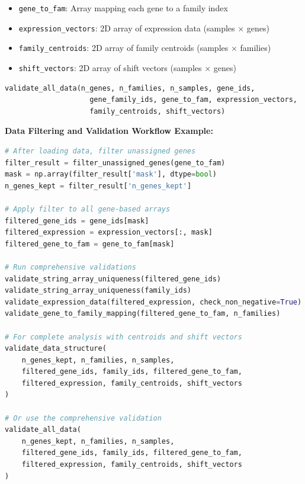 \begin{enumerate}
\begin{itemize}
\begin{itemize}
                    \item \texttt{gene\_to\_fam}: Array mapping each gene to a family index
                          
                    \item \texttt{expression\_vectors}: 2D array of expression data (samples
                          × genes)
                          
                    \item \texttt{family\_centroids}: 2D array of family centroids (samples
                          × families)
                          
                    \item \texttt{shift\_vectors}: 2D array of shift vectors (samples ×
                          genes)
                  \end{itemize}
                  
                  \begin{lstlisting}[language=Python, caption={Python Validate All Data}]
validate_all_data(n_genes, n_families, n_samples, gene_ids, 
                    gene_family_ids, gene_to_fam, expression_vectors, 
                    family_centroids, shift_vectors)
                  \end{lstlisting}
                  
                  \textbf{Data Filtering and Validation Workflow Example:} 
                  \begin{lstlisting}[language=Python, caption={Python Data Filtering and Validation Workflow}]
# After loading data, filter unassigned genes
filter_result = filter_unassigned_genes(gene_to_fam)
mask = np.array(filter_result['mask'], dtype=bool)
n_genes_kept = filter_result['n_genes_kept']

# Apply filter to all gene-based arrays
filtered_gene_ids = gene_ids[mask]
filtered_expression = expression_vectors[:, mask]
filtered_gene_to_fam = gene_to_fam[mask]

# Run comprehensive validations
validate_string_array_uniqueness(filtered_gene_ids)
validate_string_array_uniqueness(family_ids)
validate_expression_data(filtered_expression, check_non_negative=True)
validate_gene_to_family_mapping(filtered_gene_to_fam, n_families)

# For complete analysis with centroids and shift vectors
validate_data_structure(
    n_genes_kept, n_families, n_samples, 
    filtered_gene_ids, family_ids, filtered_gene_to_fam,
    filtered_expression, family_centroids, shift_vectors
)

# Or use the comprehensive validation
validate_all_data(
    n_genes_kept, n_families, n_samples,
    filtered_gene_ids, family_ids, filtered_gene_to_fam,
    filtered_expression, family_centroids, shift_vectors
)
            \end{lstlisting}
          \end{itemize}
\end{enumerate}